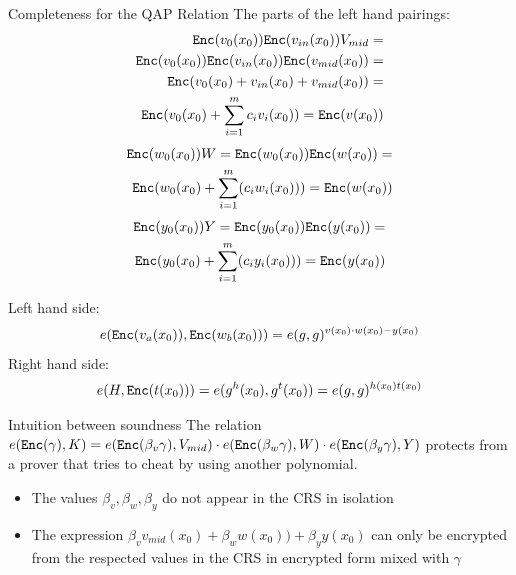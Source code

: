 \documentclass[handouts]{beamer}
\begin{document}
\begin{frame}[allowframebreaks]{Completeness for the QAP Relation}
The parts of the left hand pairings:
\begin{align*}
\small
\mathtt{Enc}(v_0(x_0)) \mathtt{Enc}(v_{in}(x_0)) V_{mid} = \\
\mathtt{Enc}(v_0(x_0)) \mathtt{Enc}(v_{in}(x_0)) \mathtt{Enc}(v_{mid}(x_0)) = \\
\mathtt{Enc}(v_0(x_0) + v_{in}(x_0) + v_{mid}(x_0)) = \\ 
\mathtt{Enc}(v_0(x_0)+\sum_{i=1}^m c_i v_i(x_0)) = \mathtt{Enc}(v(x_0))
\end{align*}
\pause
\begin{align*}\small
\mathtt{Enc}(w_0(x_0))W= 
\mathtt{Enc}(w_0(x_0))\mathtt{Enc}(w(x_0))=\\
\mathtt{Enc}(w_0(x_0)+\sum_{i=1}^m(c_i w_i(x_0)))=\mathtt{Enc}(w(x_0))
\end{align*}
\pause
\begin{align*}\small
\mathtt{Enc}(y_0(x_0))Y= 
\mathtt{Enc}(y_0(x_0))\mathtt{Enc}(y(x_0))=\\
\mathtt{Enc}(y_0(x_0)+\sum_{i=1}^m(c_i y_i(x_0)))=\mathtt{Enc}(y(x_0))
\end{align*}

\framebreak
Left hand side:
\begin{align*}
e(\mathtt{Enc}(v_a(x_0)),\mathtt{Enc}(w_b(x_0)))=e(g,g)^{v(x_0) \cdot w(x_0) - y(x_0)}
\end{align*}
Right hand side:
\begin{align*}
e(H,\mathtt{Enc}(t(x_0)))=e(g^h(x_0),g^t(x_0))=e(g,g)^{h(x_0)t(x_0)}
\end{align*}
\end{frame}

\begin{frame}{Intuition between soundness}
The relation 
$e(\mathtt{Enc}(\gamma),K) = e(\mathtt{Enc}(\beta_v \gamma),V_{mid}) \cdot e(\mathtt{Enc}(\beta_w \gamma),W) \cdot e(\mathtt{Enc}(\beta_y \gamma),Y)$
protects from a prover that tries to cheat by using another polynomial. \pause
\begin{itemize}
    \item The values $\beta_v, \beta_w, \beta_y$ do not appear in the CRS in isolation \pause
    \item The expression $\beta_v v_{mid}(x_0) + \beta_w w(x_0))+\beta_y y(x_0) $ can only be encrypted from the respected values in the CRS in encrypted form mixed with $\gamma$ \pause
\end{itemize}
\end{frame}
\end{document}
